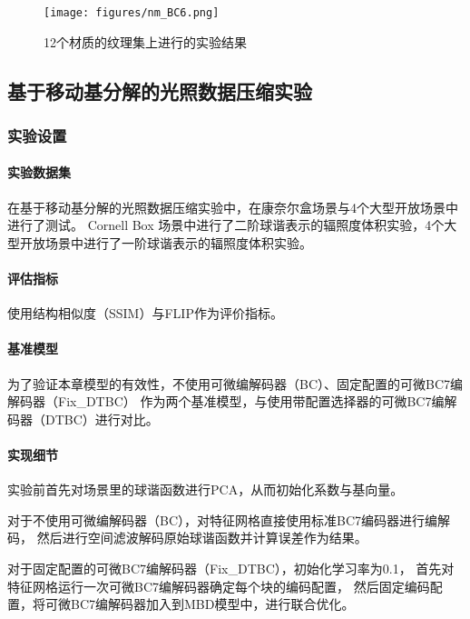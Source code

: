\begin{figure}[htbp]
    \centering
    \texttt{[image: figures/nm\_BC6.png]}
    \caption{12个材质的纹理集上进行的实验结果}
    \label{fig:nm_BC6}
\end{figure}


\subsection{基于移动基分解的光照数据压缩实验}

\subsubsection{实验设置}

\paragraph{实验数据集}

在基于移动基分解的光照数据压缩实验中，在康奈尔盒场景与4个大型开放场景中进行了测试。
Cornell Box 场景中进行了二阶球谐表示的辐照度体积实验，4个大型开放场景中进行了一阶球谐表示的辐照度体积实验。

\paragraph{评估指标}

使用结构相似度（SSIM）与FLIP作为评价指标。

\paragraph{基准模型}

为了验证本章模型的有效性，不使用可微编解码器（BC）、固定配置的可微BC7编解码器（Fix\_DTBC）
作为两个基准模型，与使用带配置选择器的可微BC7编解码器（DTBC）进行对比。

\paragraph{实现细节}

实验前首先对场景里的球谐函数进行PCA，从而初始化系数与基向量。

对于不使用可微编解码器（BC），对特征网格直接使用标准BC7编码器进行编解码，
然后进行空间滤波解码原始球谐函数并计算误差作为结果。

对于固定配置的可微BC7编解码器（Fix\_DTBC），初始化学习率为0.1，
首先对特征网格运行一次可微BC7编解码器确定每个块的编码配置，
然后固定编码配置，将可微BC7编解码器加入到MBD模型中，进行联合优化。

